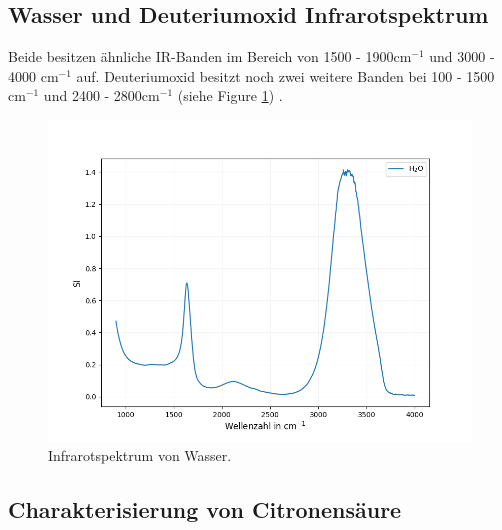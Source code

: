 \documentclass[10pt,a4paper]{article}
\begin{document}
		\subsection{Wasser und Deuteriumoxid Infrarotspektrum}

			Beide besitzen ähnliche IR-Banden im Bereich von 1500 - 1900cm$^{-1}$ und 3000 - 4000  cm$^{-1}$  auf. Deuteriumoxid besitzt noch zwei weitere Banden bei 100 - 1500 cm$^{-1}$ und 2400 - 2800cm$^{-1}$ (siehe Figure \ref{fig:water}) .
		
			\begin{figure}[H]
				\centering
				\includegraphics[scale=0.55]{Onlywater.png}
				\caption{Infrarotspektrum von Wasser.}
				\label{fig:water}
			\end{figure}
		
	
		\subsection{Charakterisierung von Citronensäure}
		
\end{document}
